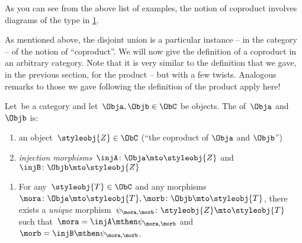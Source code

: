 
As you can see from the above list of examples, the notion of coproduct involves diagrams of the type in \cref{fig:coprod_generic}.

\begin{figure}[h!]
    \centering
    \caption{}
    \label{fig:coprod_generic}
\end{figure}

As mentioned above, the disjoint union is a particular instance -- in the category \Set  -- of the notion of ``coproduct''.
We will now give the definition of a coproduct in an arbitrary category.
Note that it is very similar to the definition that we gave, in the previous section, for the product -- but with a few twists.
Analogous remarks to those we gave following the definition of the product apply here!

\begin{ctdefinition}
    \label{def:catcoproduct}
    Let~\CatC be a category and let~$\Obja, \Objb \in \ObC$ be objects.
    The \emph{} of~$\Obja$ and~$\Objb$ is:  \\
    \constit
    \begin{enumerate}
        \item an object~$\styleobj{Z} \in \ObC$ (``the coproduct of $\Obja$ and $\Objb$'')
        \item \emph{injection morphisms}~$\injA \colon \Obja \mto \styleobj{Z} $ and~$\injB \colon \Objb \mto \styleobj{Z} $
    \end{enumerate}
    \condit
    \begin{enumerate}
        \item For any~$\styleobj{T} \in \ObC$ and any morphisms~$\mora \colon  \Obja \mto \styleobj{T}, \morb \colon \Objb \mto \styleobj{T}$, there exists a \emph{unique} morphism~$\psi_{\mora, \morb} \colon \styleobj{Z} \mto \styleobj{T}$ such that~$\mora = \injA\mthen \psi_{\mora, \morb}$ and~$\morb = \injB \mthen \psi_{\mora,\morb}$.
    \end{enumerate}
\end{ctdefinition}

